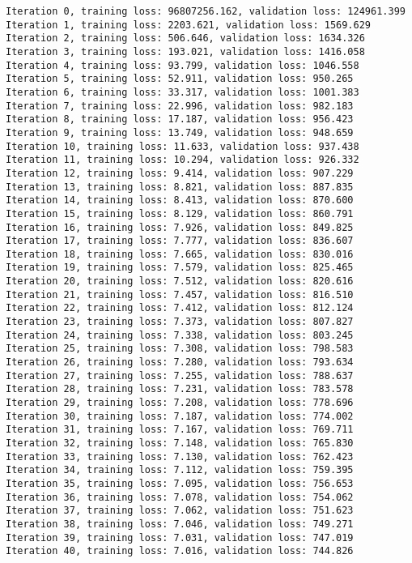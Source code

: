 \documentclass[11pt]{article}
\begin{document}
    \begin{Verbatim}[commandchars=\\\{\}]
Iteration 0, training loss: 96807256.162, validation loss: 124961.399
Iteration 1, training loss: 2203.621, validation loss: 1569.629
Iteration 2, training loss: 506.646, validation loss: 1634.326
Iteration 3, training loss: 193.021, validation loss: 1416.058
Iteration 4, training loss: 93.799, validation loss: 1046.558
Iteration 5, training loss: 52.911, validation loss: 950.265
Iteration 6, training loss: 33.317, validation loss: 1001.383
Iteration 7, training loss: 22.996, validation loss: 982.183
Iteration 8, training loss: 17.187, validation loss: 956.423
Iteration 9, training loss: 13.749, validation loss: 948.659
Iteration 10, training loss: 11.633, validation loss: 937.438
Iteration 11, training loss: 10.294, validation loss: 926.332
Iteration 12, training loss: 9.414, validation loss: 907.229
Iteration 13, training loss: 8.821, validation loss: 887.835
Iteration 14, training loss: 8.413, validation loss: 870.600
Iteration 15, training loss: 8.129, validation loss: 860.791
Iteration 16, training loss: 7.926, validation loss: 849.825
Iteration 17, training loss: 7.777, validation loss: 836.607
Iteration 18, training loss: 7.665, validation loss: 830.016
Iteration 19, training loss: 7.579, validation loss: 825.465
Iteration 20, training loss: 7.512, validation loss: 820.616
Iteration 21, training loss: 7.457, validation loss: 816.510
Iteration 22, training loss: 7.412, validation loss: 812.124
Iteration 23, training loss: 7.373, validation loss: 807.827
Iteration 24, training loss: 7.338, validation loss: 803.245
Iteration 25, training loss: 7.308, validation loss: 798.583
Iteration 26, training loss: 7.280, validation loss: 793.634
Iteration 27, training loss: 7.255, validation loss: 788.637
Iteration 28, training loss: 7.231, validation loss: 783.578
Iteration 29, training loss: 7.208, validation loss: 778.696
Iteration 30, training loss: 7.187, validation loss: 774.002
Iteration 31, training loss: 7.167, validation loss: 769.711
Iteration 32, training loss: 7.148, validation loss: 765.830
Iteration 33, training loss: 7.130, validation loss: 762.423
Iteration 34, training loss: 7.112, validation loss: 759.395
Iteration 35, training loss: 7.095, validation loss: 756.653
Iteration 36, training loss: 7.078, validation loss: 754.062
Iteration 37, training loss: 7.062, validation loss: 751.623
Iteration 38, training loss: 7.046, validation loss: 749.271
Iteration 39, training loss: 7.031, validation loss: 747.019
Iteration 40, training loss: 7.016, validation loss: 744.826

\end{Verbatim}
\end{document}
